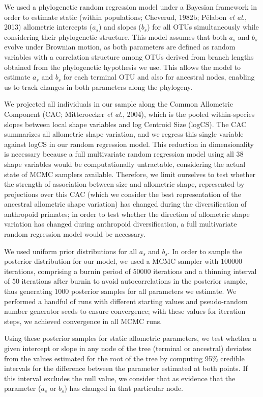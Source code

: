 \documentclass[12pt,twoside]{report}
\begin{document}
We used a phylogenetic random regression model under a Bayesian
framework in order to estimate static (within populations; Cheverud,
1982b; Pélabon \emph{et al.}, 2013) allometric intercepts ($a_s$) and
slopes ($b_s$) for all OTUs simultaneously while considering their
phylogenetic structure. This model assumes that both $a_s$ and $b_s$
evolve under Brownian motion, as both parameters are defined as random
variables with a correlation structure among OTUs derived from branch
lengths obtained from the phylogenetic hypothesis we use. This allows
the model to estimate $a_s$ and $b_s$ for each terminal OTU and also for
ancestral nodes, enabling us to track changes in both parameters along
the phylogeny.

We projected all individuals in our sample along the Common Allometric
Component (CAC; Mitteroecker \emph{et al.}, 2004), which is the pooled
within-species slopes between local shape variables and log Centroid
Size (logCS). The CAC summarizes all allometric shape variation, and we
regress this single variable against logCS in our random regression
model. This reduction in dimensionality is necessary because a full
multivariate random regression model using all 38 shape variables would
be computationally untractable, considering the actual state of MCMC
samplers available. Therefore, we limit ourselves to test whether the
strength of association between size and allometric shape, represented
by projections over this CAC (which we consider the best representation
of the ancestral allometric shape variation) has changed during the
diversification of anthropoid primates; in order to test whether the
direction of allometric shape variation has changed during anthropoid
diversification, a full multivariate random regression model would be
necessary.

We used uniform prior distributions for all $a_s$ and $b_s$. In order to
sample the posterior distribution for our model, we used a MCMC sampler
with $100000$ iterations, comprising a burnin period of $50000$
iterations and a thinning interval of $50$ iterations after burnin to
avoid autocorrelations in the posterior sample, thus generating $1000$
posterior samples for all parameters we estimate. We performed a handful
of runs with different starting values and pseudo-random number
generator seeds to ensure convergence; with these values for iteration
steps, we achieved convergence in all MCMC runs.

Using these posterior samples for static allometric parameters, we test
whether a given intercept or slope in any node of the tree (terminal or
ancestral) deviates from the values estimated for the root of the tree
by computing 95\% credible intervals for the difference between the
parameter estimated at both points. If this interval excludes the null
value, we consider that as evidence that the parameter ($a_s$ or $b_s$)
has changed in that particular node.
\end{document}
